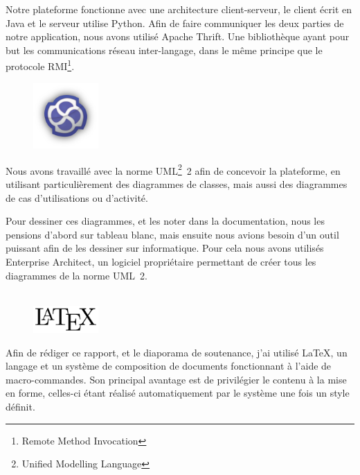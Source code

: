 Notre plateforme fonctionne avec une architecture client-serveur, le client écrit en Java et le serveur utilise Python. Afin de faire communiquer les deux parties de notre application, nous avons utilisé Apache Thrift. Une bibliothèque ayant pour but les communications réseau inter-langage, dans le même principe que le protocole RMI\footnote{Remote Method Invocation}.

\begin{figure}
	\includegraphics[width=2.5cm]{contents/images/logoEnterpriseArchitect.png}
\end{figure}
Nous avons travaillé avec la norme UML\footnote{Unified Modelling Language}~2 afin de concevoir la plateforme, en utilisant particulièrement des diagrammes de classes, mais aussi des diagrammes de cas d'utilisations ou d'activité. 

Pour dessiner ces diagrammes, et les noter dans la documentation, nous les pensions d'abord sur tableau blanc, mais ensuite nous avions besoin d'un outil puissant afin de les dessiner sur informatique. Pour cela nous avons utilisés Enterprise Architect, un logiciel propriétaire permettant de créer tous les diagrammes de la norme UML~2.\\~

\begin{figure}
	\includegraphics[width=2.5cm]{contents/images/logoLatex.png}
\end{figure}
Afin de rédiger ce rapport, et le diaporama de soutenance, j'ai utilisé \LaTeX{}, un langage et un système de composition de documents fonctionnant à l'aide de macro-commandes. Son principal avantage est de privilégier le contenu à la mise en forme, celles-ci étant réalisé automatiquement par le système une fois un style définit. 
